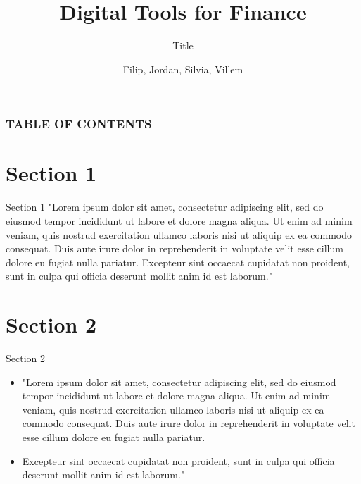 \documentclass[9pt]{beamer}
\title{Digital Tools for Finance}
\subtitle{Title}
\author{Filip,
Jordan,
Silvia,
Villem}
\institute{}
\begin{document}
\titlepage

\begin{frame}

 \frametitle{TABLE OF CONTENTS}
 \tableofcontents
\end{frame}

\section{Section 1} %
\begin{frame}{Section 1}%
"Lorem ipsum dolor sit amet, consectetur adipiscing elit, sed do eiusmod tempor incididunt ut labore et dolore magna aliqua. Ut enim ad minim veniam, quis nostrud exercitation ullamco laboris nisi ut aliquip ex ea commodo consequat. Duis aute irure dolor in reprehenderit in voluptate velit esse cillum dolore eu fugiat nulla pariatur. Excepteur sint occaecat cupidatat non proident, sunt in culpa qui officia deserunt mollit anim id est laborum."
    
\end{frame}

\section{Section 2}
\begin{frame}{Section 2}
\begin{itemize}

  \setlength\itemsep{1em}  %
  
    \item "Lorem ipsum dolor sit amet, consectetur adipiscing elit, sed do eiusmod tempor incididunt ut labore et dolore magna aliqua. Ut enim ad minim veniam, quis nostrud exercitation ullamco laboris nisi ut aliquip ex ea commodo consequat. Duis aute irure dolor in reprehenderit in voluptate velit esse cillum dolore eu fugiat nulla pariatur. 
    
    \item Excepteur sint occaecat cupidatat non proident, sunt in culpa qui officia deserunt mollit anim id est laborum."
\end{itemize}
\end{frame}
\end{document}
